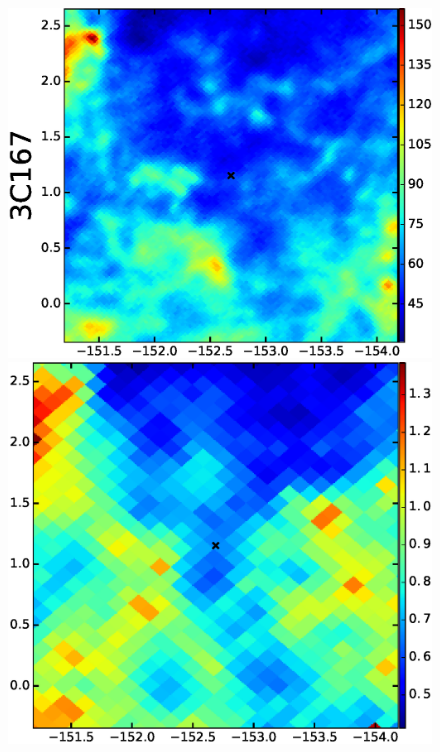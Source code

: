 \documentclass[preprint]{emulateapj}
\begin{document}
\begin{figure}
\includegraphics[scale=0.23]{fig/src_eg_apd0_r2c0.eps}
\includegraphics[scale=0.21]{fig/src_eg_apd0_r2c1.eps}

\end{figure}
\end{document}
